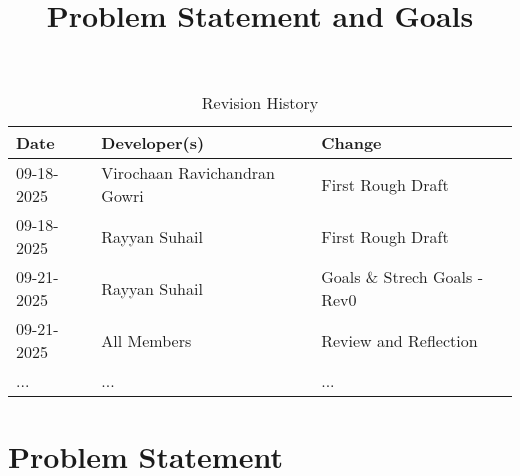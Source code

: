 \documentclass{article}
\title{Problem Statement and Goals\\\progname}
\author{\authname}
\date{}
\begin{document}
\maketitle

\begin{table}[hp]
\caption{Revision History} \label{TblRevisionHistory}
\begin{tabularx}{\textwidth}{llX}
\toprule
\textbf{Date} & \textbf{Developer(s)} & \textbf{Change}\\
\midrule
09-18-2025 & Virochaan Ravichandran Gowri & First Rough Draft\\
09-18-2025 & Rayyan Suhail & First Rough Draft\\
09-21-2025 & Rayyan Suhail & Goals \& Strech Goals - Rev0\\
09-21-2025 & All Members & Review and Reflection\\
... & ... & ...\\
\bottomrule
\end{tabularx}
\end{table}
\newpage
\section{Problem Statement}
\end{document}

